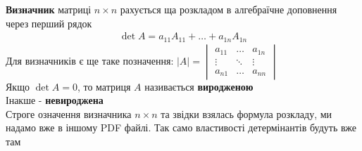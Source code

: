 \documentclass[a4paper, 10pt]{article}
\theoremstyle{theoremdd}
\begin{document}
	\textbf{Визначник} матриці $n \times n$ рахується ща розкладом в алгебраїчне доповнення через перший рядок
	\begin{align*}
	\det A = a_{11} A_{11} + \dots + a_{1n} A_{1n}
	\end{align*}
	Для визначників є ще таке позначення: $|A| = \begin{vmatrix}
	a_{11} & \dots & a_{1n} \\
	\vdots & \ddots & \vdots \\
	a_{n1} & \dots & a_{nn}
	\end{vmatrix}$
	\bigskip \\
	 Якщо $\det A = 0$, то матриця $A$ називається \textbf{виродженою} \\ Інакше - \textbf{невироджена}
	\bigskip \\
	Строге означення визначника $n \times n$ та звідки взялась формула розкладу, ми надамо вже в іншому PDF файлі. Так само властивості детермінантів будуть вже там
	\bigskip \\
\end{document}
